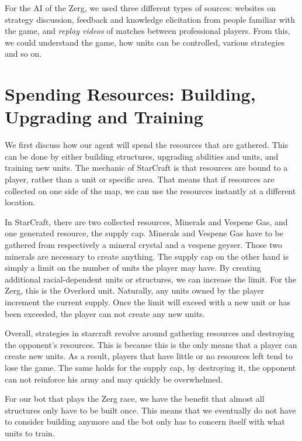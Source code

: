 For the AI of the Zerg, we used three different types of sources: websites on strategy discussion, feedback and knowledge elicitation from people familiar with the game, and \emph{replay videos} of matches between professional players. From this, we could understand the game, how units can be controlled, various strategies and so on.


\section{Spending Resources: Building, Upgrading and Training}
\label{strategy:but}
We first discuss how our agent will spend the resources that are gathered. This can be done by either building structures, upgrading abilities and units, and training new units. The mechanic of StarCraft is that resources are bound to a player, rather than a unit or specific area. That means that if resources are collected on one side of the map, we can use the resources instantly at a different location.

In StarCraft, there are two collected resources, Minerals and Vespene Gas, and one generated resource, the supply cap. Minerals and Vespene Gas have to be gathered from respectively a mineral crystal and a vespene geyser. Those two minerals are necessary to create anything. The supply cap on the other hand is simply a limit on the number of units the player may have. By creating additional racial-dependent units or structures, we can increase the limit. For the Zerg, this is the Overlord unit. Naturally, any units owned by the player increment the current supply. Once the limit will exceed with a new unit or has been exceeded, the player can not create any new units.

Overall, strategies in starcraft revolve around gathering resources and destroying the opponent's resources. This is because this is the only means that a player can create new units. As a result, players that have little or no resources left tend to lose the game. The same holds for the supply cap, by destroying it, the opponent can not reinforce his army and may quickly be overwhelmed.

For our bot that plays the Zerg race, we have the benefit that almost all structures only have to be built once. This means that we eventually do not have to consider building anymore and the bot only has to concern itself with what units to train.

